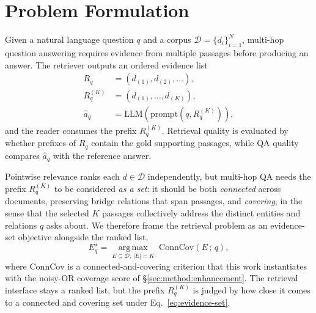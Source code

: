 %
%
%

\section{Problem Formulation}
\label{sec:problem}

Given a natural language question $q$ and a corpus
$\mathcal{D}=\{d_i\}_{i=1}^{N}$, multi-hop question answering
requires evidence from multiple passages before producing an answer.
The retriever outputs an ordered evidence list
\[
\begin{aligned}
R_q &= (d_{(1)},d_{(2)},\ldots), \\
R_q^{(K)} &= (d_{(1)},\ldots,d_{(K)}), \\
\hat{a}_q &= \mathrm{LLM}(\mathrm{prompt}(q,R_q^{(K)})),
\end{aligned}
\]
and the reader consumes the prefix $R_q^{(K)}$. Retrieval quality
is evaluated by whether prefixes of $R_q$ contain the gold
supporting passages, while QA quality compares $\hat{a}_q$ with
the reference answer.

Pointwise relevance ranks each $d \in \mathcal{D}$ independently,
but multi-hop QA needs the prefix $R_q^{(K)}$ to be considered
\emph{as a set}: it should be both \emph{connected} across
documents, preserving bridge relations that span passages, and
\emph{covering}, in the sense that the selected $K$ passages
collectively address the distinct entities and relations $q$ asks
about. We therefore frame the retrieval problem as an evidence-set
objective alongside the ranked list,
\begin{equation}
\label{eq:evidence-set}
E_q^{\star}
=
\operatorname*{arg\,max}_{E \subseteq \mathcal{D},\,|E|=K}
\;\mathrm{ConnCov}(E\,;\,q),
\end{equation}
where $\mathrm{ConnCov}$ is a connected-and-covering criterion
that this work instantiates with the noisy-OR coverage score of
\S\ref{sec:method:enhancement}. The retrieval interface stays a
ranked list, but the prefix $R_q^{(K)}$ is judged by how close it
comes to a connected and covering set under
Eq.~\ref{eq:evidence-set}.

